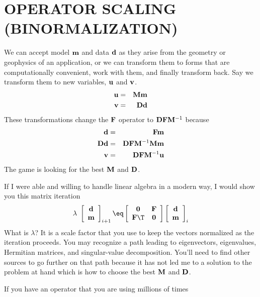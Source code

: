 \section{OPERATOR SCALING (BINORMALIZATION)}
%
We can accept model $\bold m$ and data $\bold d$ as they arise from the geometry
or geophysics of an application,
or we can transform them to forms that are computationally convenient,
work with them, and finally transform back.
Say we transform them to new variables, $\bold u$ and $\bold v$.
\begin{eqnarray}
\bold u &=& \bold M \bold m
\\
\bold v &=& \bold D \bold d
\end{eqnarray}
These transformations change the $\bold F$ operator to $ \bold D \bold F \bold M^{-1} $ because
\begin{eqnarray}
\bold d &=& \bold F \bold m
\\
\bold D \bold d &=& \bold D \bold F \bold M^{-1} \bold M \bold m
\\
\bold v &=& \bold D \bold F \bold M^{-1} \bold u
\end{eqnarray}
The game is looking for the best
$\bold M$ and
$\bold D$.
\par
If I were able and willing to handle linear algebra in a modern way,
I would show you this matrix iteration
\begin{equation}
\lambda\ 
\left[
	\begin{array}{c}
	\bold d   \\
	\bold m 
	\end{array}
\right]_{i+1}
\eq
\left[
	\begin{array}{cc}
	\bold 0 & \bold F  \\
	\bold F\T & \bold 0
	\end{array}
\right]
\left[
	\begin{array}{c}
	\bold d   \\
	\bold m 
	\end{array}
\right]_i
\end{equation}
What is $\lambda$?  
It is a scale factor that you use to keep the vectors normalized
as the iteration proceeds.
You may recognize a path leading to eigenvectors, eigenvalues, Hermitian matrices,
and singular-value decomposition.
You'll need to find other sources to go further on that path because
it has not led me to a solution to the problem at hand
which is how to choose the best $\bold M$ and $\bold D$.
\par
If you have an operator that you are using millions of times 
